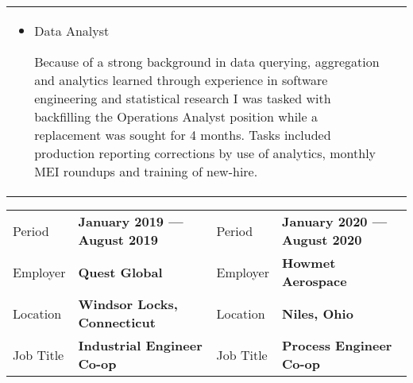 \documentclass[a4paper, oneside, final, fontsize=9pt, usegeometry]{scrartcl} %
\newcommand{\gray}{\rowcolor[gray]{.90}} %
\begin{document}
\begin{center}
\begin{tabularx}{0.97\linewidth}{XX}
\begin{itemize}
        \item{Data Analyst}
        \begin{sloppypar}
            Because of a strong background in data querying, aggregation and analytics learned through experience in software engineering and statistical research I was tasked with backfilling the Operations Analyst position while a replacement was sought for 4 months. Tasks included production reporting corrections by use of analytics, monthly MEI roundups and training of new-hire. 
        \end{sloppypar}
    \end{itemize}
\end{tabularx}

\vspace{-8pt}

\begin{tabularx}{0.97\linewidth}{ZY|ZY}
    \gray{}Period    & \textbf{January 2019 --- August 2019} & Period & \textbf{January 2020 --- August 2020}\\
    \gray{}Employer  & \textbf{Quest Global}                 & Employer & \textbf{Howmet Aerospace} \\
    \gray{}Location  & \textbf{Windsor Locks, Connecticut}   & Location & \textbf{Niles, Ohio}\\
    \gray{}Job Title & \textbf{Industrial Engineer Co-op}          & Job Title & \textbf{Process Engineer Co-op}\\
\end{tabularx}


\end{center}
\end{document}
